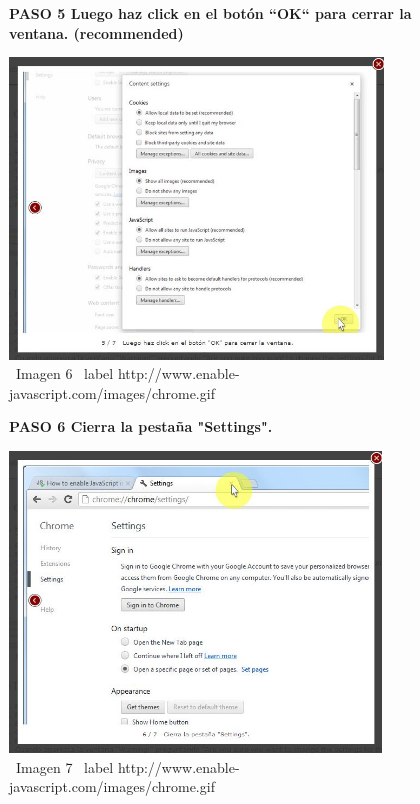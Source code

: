 \documentclass[11pt]{article} %
\begin{document}
\begin{figure}
\begin{center}
\begin{center}
\bf PASO 5
Luego haz click en el botón ``OK`` para cerrar la ventana. (recommended)
\newline
\end{center}

\includegraphics[height=8cm, width=8 cm] {imagenes/chrome 05.jpg}
\newline
\newline
\ Imagen 6
\ label { http://www.enable-javascript.com/images/chrome.gif }
\newline
\begin{center}
\bf PASO 6 Cierra la pestaña "Settings".
\end{center}

\includegraphics[height=8cm, width=8 cm] {imagenes/chrome 06.jpg}
\newline
\newline
\ Imagen 7
\ label { http://www.enable-javascript.com/images/chrome.gif }


\end{center}
\end{figure}
\end{document}
